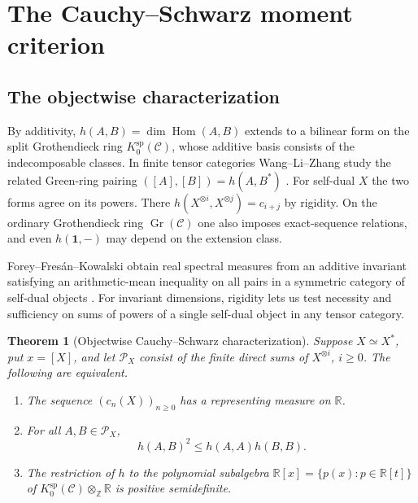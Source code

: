 \documentclass[11pt,reqno]{amsart}
\newtheorem{theorem}{Theorem}[section]
\theoremstyle{definition}
\newcommand{\Hom}{\operatorname{Hom}}
\newcommand{\one}{\mathbf 1}
\newcommand{\C}{\mathcal C}
\newcommand{\PX}{\mathcal P_X}
\newcommand{\RR}{\mathbb R}
\newcommand{\ZZ}{\mathbb Z}
\DeclareMathOperator{\Gr}{Gr}
\begin{document}
\section{The Cauchy--Schwarz moment criterion}\label{sec:criterion}
\subsection{The objectwise characterization}
By additivity, $h(A,B)=\dim\Hom(A,B)$ extends to a bilinear form on the split Grothendieck ring $K^{\mathrm{sp}}_0(\C)$, whose additive basis consists of the indecomposable classes. In finite tensor categories Wang--Li--Zhang study the related Green-ring pairing $([A],[B])=h(A,B^*)$ \cite[\S3.1]{WLZ}. For self-dual $X$ the two forms agree on its powers. There $h(X^{\otimes i},X^{\otimes j})=c_{i+j}$ by rigidity. On the ordinary Grothendieck ring $\Gr(\C)$ one also imposes exact-sequence relations, and even $h(\one,-)$ may depend on the extension class.

Forey--Fres\'an--Kowalski obtain real spectral measures from an additive invariant satisfying an arithmetic-mean inequality on all pairs in a symmetric category of self-dual objects \cite[Proposition~2.1]{FFK}. For invariant dimensions, rigidity lets us test necessity and sufficiency on sums of powers of a single self-dual object in any tensor category.

\begin{theorem}[Objectwise Cauchy--Schwarz characterization]\label{thm:main}
Suppose $X\simeq X^*$, put $x=[X]$, and let $\PX$ consist of the finite direct sums
of $X^{\otimes i}$, $i\ge0$. The following are equivalent.
\begin{enumerate}
\item The sequence $(c_n(X))_{n\ge0}$ has a representing measure on $\RR$.
\item For all $A,B\in\PX$,
\begin{equation}\label{eq:cs}
                    h(A,B)^2\le h(A,A)h(B,B).
\end{equation}
\item The restriction of $h$ to the polynomial subalgebra
$\RR[x]=\{p(x):p\in\RR[t]\}$
of $K^{\mathrm{sp}}_0(\C)\otimes_{\ZZ}\RR$ is positive semidefinite.
\end{enumerate}
\end{theorem}
\end{document}

